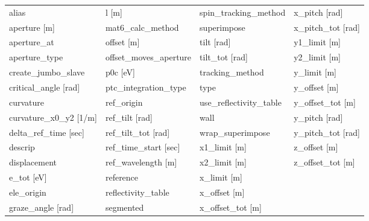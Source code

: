  \begin{tabular}{llll} \toprule
alias                            & l [m]                            & spin_tracking_method             & x_pitch [rad]                    \\
aperture [m]                     & mat6_calc_method                 & superimpose                      & x_pitch_tot [rad]                \\
aperture_at                      & offset [m]                       & tilt [rad]                       & y1_limit [m]                     \\
aperture_type                    & offset_moves_aperture            & tilt_tot [rad]                   & y2_limit [m]                     \\
create_jumbo_slave               & p0c [eV]                         & tracking_method                  & y_limit [m]                      \\
critical_angle [rad]             & ptc_integration_type             & type                             & y_offset [m]                     \\
curvature                        & ref_origin                       & use_reflectivity_table           & y_offset_tot [m]                 \\
curvature_x0_y2 [1/m]            & ref_tilt [rad]                   & wall                             & y_pitch [rad]                    \\
delta_ref_time [sec]             & ref_tilt_tot [rad]               & wrap_superimpose                 & y_pitch_tot [rad]                \\
descrip                          & ref_time_start [sec]             & x1_limit [m]                     & z_offset [m]                     \\
displacement                     & ref_wavelength [m]               & x2_limit [m]                     & z_offset_tot [m]                 \\
e_tot [eV]                       & reference                        & x_limit [m]                      &                                  \\
ele_origin                       & reflectivity_table               & x_offset [m]                     &                                  \\
graze_angle [rad]                & segmented                        & x_offset_tot [m]                 &                                  \\
 \bottomrule
 \end{tabular}
 \vfill
 

